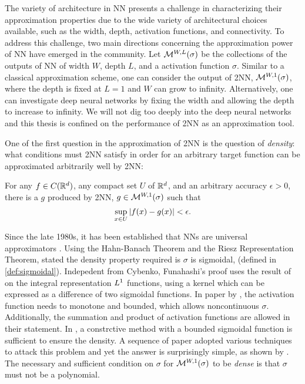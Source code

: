 
The variety of architecture in NN presents a challenge in characterizing their
approximation properties due to the wide variety of architectural choices
available, such as the width, depth, activation functions, and connectivity. To
address this challenge, two main directions concerning the approximation power
of NN have emerged in the community. Let $\mathcal{M}^{ {W}, {L} }( {\sigma} )$ be the
collections of the outputs of NN of width $W$, depth $L$, and a activation
function $\sigma$. Similar to a classical approximation scheme, one can consider
the output of 2NN, $\mathcal{M}^{ {W}, {1} }( {\sigma} )$, where the depth is fixed at $L=1$
and $W$ can grow to infinity. Alternatively, one can investigate deep neural
networks by fixing the width and allowing the depth to increase to infinity. We
will not dig too deeply into the deep neural networks and this thesis is
confined on the performance of 2NN as an approximation tool.


One of the first question in the approximation of 2NN is the question of
\textit{density}: what conditions must 2NN satisfy in order for an arbitrary
target function can be approximated arbitrarily well by 2NN:

For any $f \in C(\mathbb{R}^d)$, any compact set $U$ of $\mathbb{R}^d$, and an arbitrary
accuracy $\epsilon > 0$, there is a $g$ produced by 2NN, $g \in
\mathcal{M}^{ {W}, {1} }( {\sigma} )$ such that 
\begin{equation*}
    \sup_{x \in U} \left| f(x) - g(x) \right| < \epsilon.
\end{equation*}

Since the late 1980s, it has been established that NNs are universal
approximators \citep{carrollConstructionNeuralNets1989,
cybenkoApproximationSuperpositionsSigmoidal1989,
hornikMultilayerFeedforwardNetworks1989a,
funahashiApproximateRealizationContinuous1989}. Using the Hahn-Banach Theorem
and the Riesz Representation Theorem,
\cite{cybenkoApproximationSuperpositionsSigmoidal1989} stated the density
property required is $\sigma$ is sigmoidal, (defined in \eqref{def:sigmoidal}).
Indepedent from Cybenko, Funahashi’s proof uses the result of
\cite{irieCapabilitiesThreelayeredPerceptrons1988} on the integral
representation $L^{1}$ functions, using a kernel which can be expressed as a
difference of two sigmoidal functions. In paper by
\cite{hornikMultilayerFeedforwardNetworks1989a}, the activation function needs
to monotone and bounded, which allows noncontinuous $\sigma$. Additionally, the
summation and product of activation functions are allowed in their statement. In
\cite{jonesSimpleLemmaGreedy1992}, a constrctive method with a bounded sigmoidal
function is sufficient to ensure the density. A sequence of paper adopted
various techniques to attack this problem and yet the answer is surprisingly
simple, as shown by \cite{leshnoMultilayerFeedforwardNetworks1993}. The
necessary and sufficient condition on $\sigma$ for $\mathcal{M}^{ {W}, {1} }( {\sigma} )$ to be
\textit{dense} is that $\sigma$ must not be a polynomial. 

